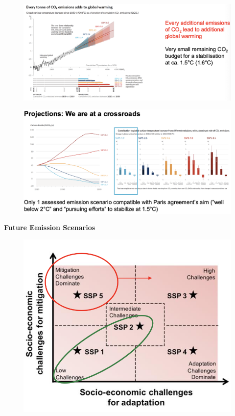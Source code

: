 \documentclass[fontsize=8pt, a4paper, landscape, fleqn]{scrartcl}
\renewcommand{\subsection}[1]{%
    \noindent\colorbox{subsectioncolor}{%
        \parbox{\dimexpr\columnwidth-2\fboxsep}{\color{white}\textbf{#1}}}%
    \vspace{0.5mm}%
}
\begin{document}
\begin{multicols*}{3}[\raggedcolumns]
\begin{figure}[H]
    \centering
    \includegraphics[width=0.9\linewidth]{CS//img/ton_of_Co2.png}
\end{figure} 
\begin{figure}[H]
    \centering
    \includegraphics[width=0.9\linewidth]{CS//img/projections_crossroad.png}
\end{figure}







\subsection{Future Emission Scenarios}
\begin{figure}[H]
    \centering
    \includegraphics[width=0.6\linewidth]{CS//img/Scenarios_IPCC.png}
\end{figure}


\end{multicols*}
\end{document}
